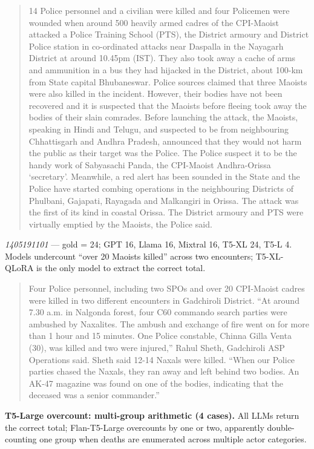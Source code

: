 \documentclass[
  11pt,
]{article}
\begin{document}
\begin{quote}
14 Police personnel and a civilian were killed and four Policemen were
wounded when around 500 heavily armed cadres of the CPI-Maoist attacked
a Police Training School (PTS), the District armoury and District Police
station in co-ordinated attacks near Daspalla in the Nayagarh District
at around 10.45pm (IST). They also took away a cache of arms and
ammunition in a bus they had hijacked in the District, about 100-km from
State capital Bhubaneswar. Police sources claimed that three Maoists
were also killed in the incident. However, their bodies have not been
recovered and it is suspected that the Maoists before fleeing took away
the bodies of their slain comrades. Before launching the attack, the
Maoists, speaking in Hindi and Telugu, and suspected to be from
neighbouring Chhattisgarh and Andhra Pradesh, announced that they would
not harm the public as their target was the Police. The Police suspect
it to be the handy work of Sabyasachi Panda, the CPI-Maoist
Andhra-Orissa `secretary'. Meanwhile, a red alert has been sounded in
the State and the Police have started combing operations in the
neighbouring Districts of Phulbani, Gajapati, Rayagada and Malkangiri in
Orissa. The attack was the first of its kind in coastal Orissa. The
District armoury and PTS were virtually emptied by the Maoists, the
Police said.
\end{quote}

\noindent \emph{1405191101} --- gold = 24; GPT 16, Llama 16, Mixtral 16,
T5-XL 24, T5-L 4. Models undercount ``over 20 Maoists killed'' across
two encounters; T5-XL-QLoRA is the only model to extract the correct
total.

\begin{quote}
Four Police personnel, including two SPOs and over 20 CPI-Maoist cadres
were killed in two different encounters in Gadchiroli District. ``At
around 7.30 a.m. in Nalgonda forest, four C60 commando search parties
were ambushed by Naxalites. The ambush and exchange of fire went on for
more than 1 hour and 15 minutes. One Police constable, Chinna Gilla
Venta (30), was killed and two were injured,'' Rahul Sheth, Gadchiroli
ASP Operations said. Sheth said 12-14 Naxals were killed. ``When our
Police parties chased the Naxals, they ran away and left behind two
bodies. An AK-47 magazine was found on one of the bodies, indicating
that the deceased was a senior commander.''
\end{quote}

\medskip\noindent \textbf{T5-Large overcount: multi-group arithmetic (4 cases).}
All LLMs return the correct total; Flan-T5-Large overcounts by one or
two, apparently double-counting one group when deaths are enumerated
across multiple actor categories.
\end{document}
